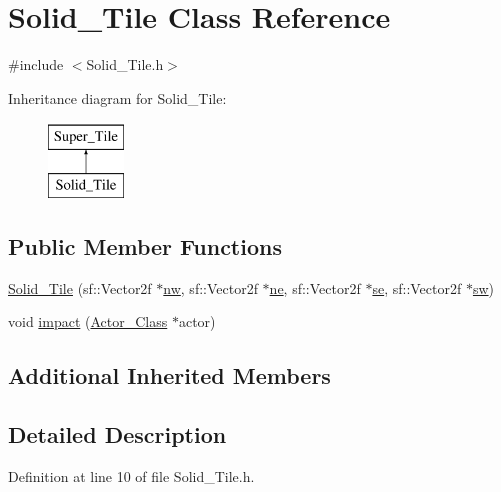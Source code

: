 \hypertarget{class_solid___tile}{}\section{Solid\+\_\+\+Tile Class Reference}
\label{class_solid___tile}


{\ttfamily \#include $<$Solid\+\_\+\+Tile.\+h$>$}

Inheritance diagram for Solid\+\_\+\+Tile\+:\begin{figure}[H]
\begin{center}
\leavevmode
\includegraphics[height=2.000000cm]{class_solid___tile}
\end{center}
\end{figure}
\subsection*{Public Member Functions}
\begin{DoxyCompactItemize}
\item 
\hyperlink{class_solid___tile_a2f40382f46c06ba040266d2b37503101}{Solid\+\_\+\+Tile} (sf\+::\+Vector2f $\ast$\hyperlink{class_super___tile_ad6bcea1fd54f67808f54ba2aacd88596}{nw}, sf\+::\+Vector2f $\ast$\hyperlink{class_super___tile_a55f6d2860da36f13019bd4e0d18364ca}{ne}, sf\+::\+Vector2f $\ast$\hyperlink{class_super___tile_ab384b89a7a631b8b75c4d405c51a23e1}{se}, sf\+::\+Vector2f $\ast$\hyperlink{class_super___tile_abe9efe0c3d1ed440395225843435dfc8}{sw})
\item 
void \hyperlink{class_solid___tile_ada34ec00762b7df804292f40fbeecc95}{impact} (\hyperlink{class_actor___class}{Actor\+\_\+\+Class} $\ast$actor)
\end{DoxyCompactItemize}
\subsection*{Additional Inherited Members}


\subsection{Detailed Description}


Definition at line 10 of file Solid\+\_\+\+Tile.\+h.



